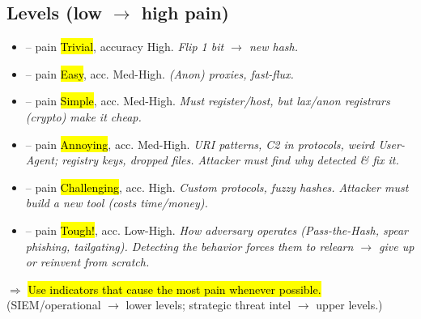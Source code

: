 \subsection{Levels (low $\to$ high pain)}
\begin{itemize}
\item {} -- pain \hl{Trivial}, accuracy High. \textit{Flip 1 bit $\to$ new hash.}
\item {} -- pain \hl{Easy}, acc. Med-High. \textit{(Anon) proxies, fast-flux.}
\item {} -- pain \hl{Simple}, acc. Med-High. \textit{Must register/host, but lax/anon registrars (crypto) make it cheap.}
\item {} -- pain \hl{Annoying}, acc. Med-High. \textit{URI patterns, C2 in protocols, weird User-Agent; registry keys, dropped files. Attacker must find why detected \& fix it.}
\item {} -- pain \hl{Challenging}, acc. High. \textit{Custom protocols, fuzzy hashes. Attacker must build a new tool (costs time/money).}
\item {} -- pain \hl{Tough!}, acc. Low-High. \textit{How adversary operates (Pass-the-Hash, spear phishing, tailgating). Detecting the behavior forces them to relearn $\to$ give up or reinvent from scratch.}
\end{itemize}
$\Rightarrow$ \hl{Use indicators that cause the most pain whenever possible.} (SIEM/operational $\to$ lower levels; strategic threat intel $\to$ upper levels.)

